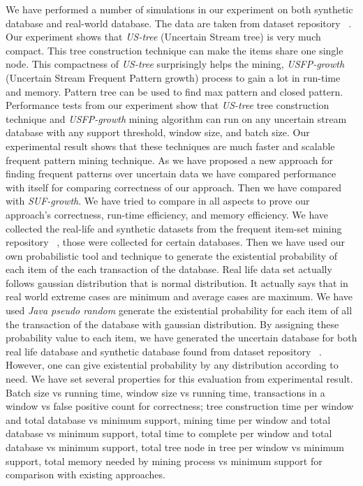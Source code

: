 \documentclass[conference]{IEEEtran}
\begin{document}
We have performed a number of simulations in our experiment on both synthetic database and real-world database. The data are taken from dataset repository ~\cite{dataset}. Our experiment shows that \emph{US-tree} (Uncertain Stream tree) is very much compact. This tree construction technique can make the items share one single node. This compactness of \emph{US-tree} surprisingly helps the mining, \emph{USFP-growth} (Uncertain Stream Frequent Pattern growth) process to gain a lot in run-time and memory. Pattern tree can be used to find max pattern and closed pattern. Performance tests from our experiment show that \emph{US-tree} tree construction technique and \emph{USFP-growth} mining algorithm can run on any uncertain stream database with any support threshold, window size, and batch size. Our experimental result shows that these techniques are much faster and scalable frequent pattern mining technique. As we have proposed a new approach for finding frequent patterns over uncertain data we have compared performance with itself for comparing correctness of our approach. Then we have compared with \emph{SUF-growth}. We have tried to compare in all aspects to prove our approach's correctness, run-time efficiency, and memory efficiency. We have collected the real-life and synthetic datasets from the frequent item-set mining repository ~\cite{dataset}, those were collected for certain databases. Then we have used our own probabilistic tool and technique to generate the existential probability of each item of the each transaction of the database. Real life data set actually follows gaussian distribution that is normal distribution. It actually says that in real world extreme cases are minimum and average cases are maximum. We have used \emph{Java pseudo random} generate the existential probability for each item of all the transaction of the database with gaussian distribution. By assigning these probability value to each item, we have generated the uncertain database for both real life database and synthetic database found from dataset repository ~\cite{dataset}. However, one can give existential probability by any distribution according to need. We have set several properties for this evaluation from experimental result. Batch size vs running time, window size vs running time, transactions in a window vs false positive count for correctness; tree construction time per window and total database vs minimum support, mining time per window and total database vs minimum support, total time to complete per window and total database vs minimum support, total tree node in tree per window vs minimum support, total memory needed by mining process vs minimum support for comparison with existing approaches.
\end{document}
